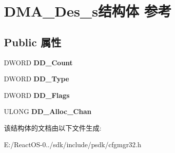 \hypertarget{struct_d_m_a___des__s}{}\section{D\+M\+A\+\_\+\+Des\+\_\+s结构体 参考}
\label{struct_d_m_a___des__s}
\subsection*{Public 属性}
\begin{DoxyCompactItemize}
\item 
\mbox{\label{struct_d_m_a___des__s_a3a87b5b8c68e9931659b9c2241985ebd}} 
D\+W\+O\+RD {\bfseries D\+D\+\_\+\+Count}
\item 
\mbox{\label{struct_d_m_a___des__s_a6ce1a032b04b3e1117ac490319129788}} 
D\+W\+O\+RD {\bfseries D\+D\+\_\+\+Type}
\item 
\mbox{\label{struct_d_m_a___des__s_a4800bc50c58687ee25e3f745cee84075}} 
D\+W\+O\+RD {\bfseries D\+D\+\_\+\+Flags}
\item 
\mbox{\label{struct_d_m_a___des__s_afba8033c979c7c5c3a92fe6631c29c68}} 
U\+L\+O\+NG {\bfseries D\+D\+\_\+\+Alloc\+\_\+\+Chan}
\end{DoxyCompactItemize}


该结构体的文档由以下文件生成\+:\begin{DoxyCompactItemize}
\item 
E\+:/\+React\+O\+S-\/0../sdk/include/psdk/cfgmgr32.\+h\end{DoxyCompactItemize}
